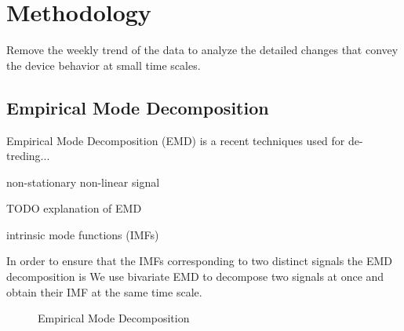 \section{Methodology}\label{method}
Remove the weekly trend of the data to analyze the detailed changes that convey the device behavior at small time scales.

\subsection{Empirical Mode Decomposition}

Empirical Mode Decomposition (EMD) \cite{huang:emd1998} is a recent techniques used for de-treding...

non-stationary non-linear signal

TODO explanation of EMD


intrinsic mode functions (IMFs)

In order to ensure that the IMFs corresponding to two distinct signals the EMD decomposition is 
We use bivariate EMD \cite{rilling:biemd2007} to decompose two signals at once and obtain their IMF at the same time scale.

\begin{figure}
 \caption{Empirical Mode Decomposition}
 \label{fig:raw}
\end{figure}

\newpage
